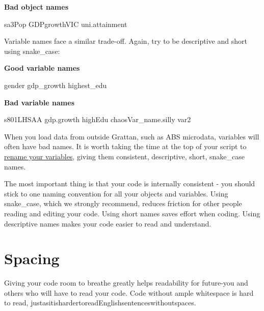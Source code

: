 \documentclass[]{book}
\newenvironment{Shaded}{\begin{snugshade}}{\end{snugshade}}
\newcommand{\NormalTok}[1]{#1}
\begin{document}
\textbf{Bad object names}

\begin{Shaded}
\begin{Highlighting}[]
\NormalTok{sa3Pop}
\NormalTok{GDPgrowthVIC}
\NormalTok{uni.attainment}
\end{Highlighting}
\end{Shaded}

Variable names face a similar trade-off. Again, try to be descriptive and short using snake\_case:

\textbf{Good variable names}

\begin{Shaded}
\begin{Highlighting}[]
\NormalTok{gender}
\NormalTok{gdp_growth}
\NormalTok{highest_edu}
\end{Highlighting}
\end{Shaded}

\textbf{Bad variable names}

\begin{Shaded}
\begin{Highlighting}[]
\NormalTok{s801LHSAA}
\NormalTok{gdp.growth}
\NormalTok{highEdu}
\NormalTok{chaosVar_name.silly}
\NormalTok{var2}
\end{Highlighting}
\end{Shaded}

When you load data from outside Grattan, such as ABS microdata, variables will often have bad names. It is worth taking the time at the top of your script to \href{https://dplyr.tidyverse.org/reference/select.html}{rename your variables}, giving them consistent, descriptive, short, snake\_case names.

The most important thing is that your code is internally consistent - you should stick to one naming convention for all your objects and variables. Using snake\_case, which we strongly recommend, reduces friction for other people reading and editing your code. Using short names saves effort when coding. Using descriptive names makes your code easier to read and understand.

\hypertarget{spacing}{%
\section{Spacing}\label{spacing}}

Giving your code room to breathe greatly helps readability for future-you and others who will have to read your code. Code without ample whitespace is hard to read, justasitishardertoreadEnglishsentenceswithoutspaces.
\end{document}
